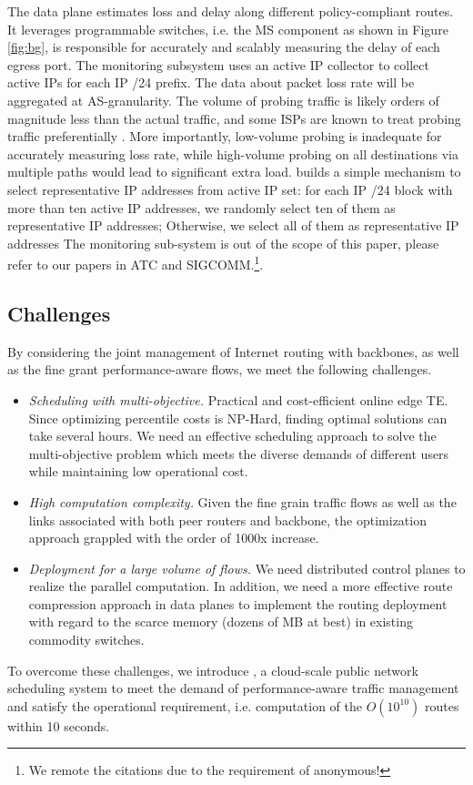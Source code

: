 The data plane estimates loss and delay along different policy-compliant routes. It leverages programmable switches, i.e. the MS component as shown in Figure \ref{fig:bg}, is responsible for accurately and scalably measuring the delay of each egress port.
The monitoring subsystem uses an active IP collector to collect active IPs for each IP /24 prefix. The data about packet loss rate will be aggregated at AS-granularity. The volume of probing traffic is likely orders of magnitude less than the actual traffic, and some ISPs are known to treat probing traffic preferentially \cite{zhang2010optimizingEntact, valancius2013PECAN, liu2016Footprint}. More importantly, low-volume probing is inadequate for accurately measuring loss rate, while high-volume probing on all destinations via multiple paths would lead to significant extra load. {\sys} builds a simple mechanism to select representative IP addresses from active IP set: for each IP /24 block with more than ten active IP addresses, we randomly select ten of them as representative IP addresses; Otherwise, we select all of them as representative IP addresses The monitoring sub-system is out of the scope of this paper, please refer to our papers in ATC and SIGCOMM.\footnote{We remote the citations due to the requirement of anonymous!}. 

\subsection{Challenges}
By considering the joint management of Internet routing with backbones, as well as the fine grant performance-aware flows, we meet the following challenges. 

\begin{itemize}[leftmargin=*] 
\item \textit{Scheduling with multi-objective.} Practical and cost-efficient online edge TE. Since optimizing percentile costs is NP-Hard, finding optimal solutions can take several hours. We need an effective scheduling approach to solve the multi-objective problem which meets the diverse demands of different users while maintaining low operational cost.  
\item \textit{High computation complexity.} Given the fine grain traffic flows as well as the links associated with both peer routers and backbone, the optimization approach grappled with the order of 1000x increase. 
\item \textit{Deployment for a large volume of flows.} We need distributed control planes to realize the parallel computation. In addition, we need a more effective route compression approach in data planes to implement the routing deployment with regard to the scarce memory (dozens of MB at best) in existing commodity switches.
\end{itemize}

To overcome these challenges, we introduce {\sys}, a cloud-scale public network scheduling system to meet the demand of performance-aware traffic management and satisfy the operational requirement, i.e. computation of the $O(10^{10})$ routes within 10 seconds.

